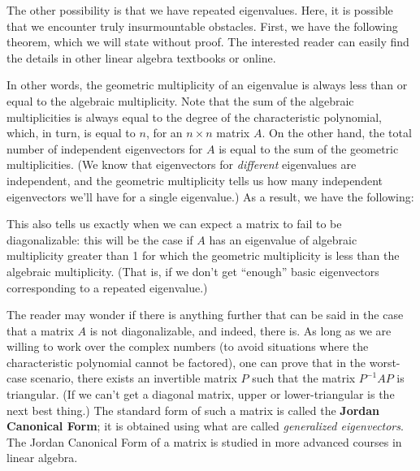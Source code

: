 The other possibility is that we have repeated eigenvalues. Here, it is possible that we encounter truly insurmountable obstacles. First, we have the following theorem, which we will state without proof. The interested reader can easily find the details in other linear algebra textbooks or online.

\smallskip


\smallskip

In other words, the geometric multiplicity of an eigenvalue is always less than or equal to the algebraic multiplicity. Note that the sum of the algebraic multiplicities is always equal to the degree of the characteristic polynomial, which, in turn, is equal to $n$, for an $n\times n$ matrix $A$. On the other hand, the total number of independent eigenvectors for $A$ is equal to the sum of the geometric multiplicities. (We know that eigenvectors for \textit{different} eigenvalues are independent, and the geometric multiplicity tells us how many independent eigenvectors we'll have for a single eigenvalue.) As a result, we have the following:

\smallskip


\smallskip

This also tells us exactly when we can expect a matrix to fail to be diagonalizable: this will be the case if $A$ has an eigenvalue of algebraic multiplicity greater than 1 for which the geometric multiplicity is less than the algebraic multiplicity. (That is, if we don't get ``enough'' basic eigenvectors corresponding to a repeated eigenvalue.)

\medskip

The reader may wonder if there is anything further that can be said in the case that a matrix $A$ is not diagonalizable, and indeed, there is. As long as we are willing to work over the complex numbers (to avoid situations where the characteristic polynomial cannot be factored), one can prove that in the worst-case scenario, there exists an invertible matrix $P$ such that the matrix $P^{-1}AP$ is triangular. (If we can't get a diagonal matrix, upper or lower-triangular is the next best thing.) The standard form of such a matrix is called the \textbf{Jordan Canonical Form}; it is obtained using what are called \textit{generalized eigenvectors}. The Jordan Canonical Form of a matrix is studied in more advanced courses in linear algebra.

